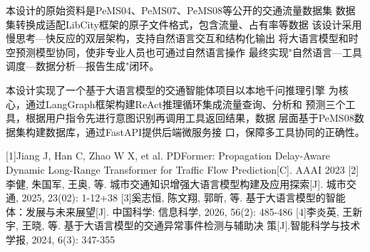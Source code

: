 \assignReq
{本设计的原始资料是PeMS04、PeMS07、PeMS08等公开的交通流量数据集}
{数据集转换成适配LibCity框架的原子文件格式，包含流量、占有率等数据}
{该设计采用慢思考—快反应的双层架构，支持自然语言交互和结构化输出}
{将大语言模型和时空预测模型协同，使非专业人员也可通过自然语言操作}
{最终实现"自然语言—工具调度—数据分析—报告生成"闭环。}

\assignWork
{本设计实现了一个基于大语言模型的交通智能体项目以本地千问推理引擎}
{为核心，通过LangGraph框架构建ReAct推理循环集成流量查询、分析和}
{预测三个工具，根据用户指令先进行意图识别再调用工具返回结果，数据}
{层面基于PeMS08数据集构建数据库，通过FastAPI提供后端微服务接}
{口，保障多工具协同的正确性。}

\assignRef
{[1]Jiang J, Han C, Zhao W X, et al. PDFormer: Propagation Delay-Aware }
{Dynamic Long-Range Transformer for Traffic Flow Prediction[C]. AAAI 2023}
{[2]李健, 朱国军, 王奥, 等. 城市交通知识增强大语言模型构建及应用探索[J].}
{城市交通, 2025, 23(02): 1-12+38}
{[3]奚志恒, 陈文翔, 郭昕, 等. 基于大语言模型的智能体：发展与未来展望[J].}
{中国科学: 信息科学, 2026, 56(2): 485-486}
{[4]李炎英, 王新宇, 王晓, 等. 基于大语言模型的交通异常事件检测与辅助决}
{策[J].智能科学与技术学报, 2024, 6(3): 347-355}
